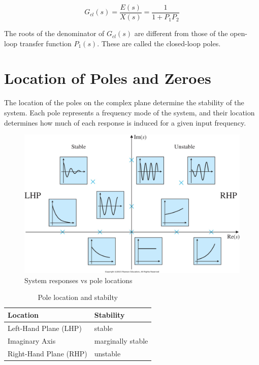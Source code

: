 \documentclass[10pt,conference,compsoc]{IEEEtran}
\begin{document}
\begin{equation}
  G_{cl}(s) = \frac{E(s)}{X(s)} = \frac{1}{1 + P_1 P_2}
\end{equation}

\noindent The roots of the denominator of $G_{cl}(s)$ are different from those
of the open-loop transfer function $P_1(s)$. These are called the closed-loop
poles.

\section{Location of Poles and Zeroes}

\noindent The location of the poles on the complex plane determine the stability
of the \gls{system}. Each pole represents a frequency mode of the \gls{system},
and their location determines how much of each response is induced for a given
input frequency.

\begin{figure}[H]
  \includegraphics[width=\linewidth]{figs/ResponseVsPoleLocations.png}
  \caption{System responses vs pole locations \cite{bib:pole_locations}}
\end{figure}

\begin{table}[ht]
  \caption{Pole location and stabilty}
  \renewcommand{\arraystretch}{1.5}
  \centering
  \begin{tabular}{|ll|}
    \hline
    \textbf{Location} & \textbf{Stability} \\
    \hline
    Left-Hand Plane (LHP) & stable \\
    Imaginary Axis & marginally stable \\
    Right-Hand Plane (RHP) & unstable \\
    \hline
  \end{tabular}
  \label{tab:pole_locations}
\end{table}
\end{document}
